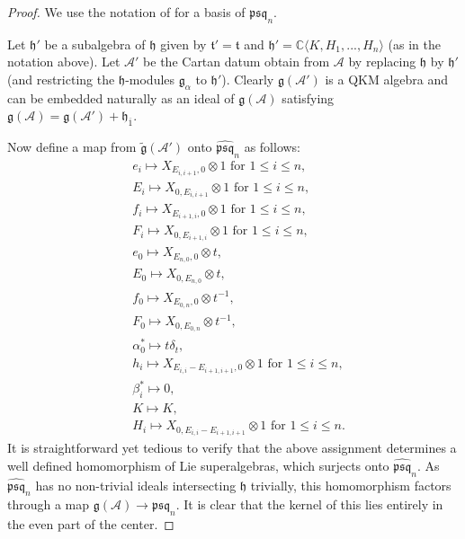 \documentclass[12pt, a4paper, reqno]{amsart}
\def\ol{\overline}
\theoremstyle{definition}
\theoremstyle{definition}
\theoremstyle{definition}
\numberwithin{theorem}{section}
\numberwithin{lemma}{section}
\numberwithin{remark}{section}
\numberwithin{definition}{section}
\numberwithin{corollary}{section}
\numberwithin{proposition}{section}
\numberwithin{example}{section}
\begin{document}
	\begin{proof}
		We use the notation of \cite{G} for a basis of \(\mathfrak{psq}_n\). \par	
		Let \(\mathfrak{h}'\) be a subalgebra of \(\mathfrak{h}\) given by \(\mathfrak{t}' = \mathfrak{t}\) and \(\mathfrak{h}' = \mathbb{C}\langle K,H_1,...,H_n \rangle\) (as in the notation above).
		Let \(\mathcal{A}'\) be the Cartan datum obtain from \(\mathcal{A}\) by replacing \(\mathfrak{h}\) by \(\mathfrak{h}'\) (and restricting the \(\mathfrak{h}\)-modules \(\mathfrak{g}_{\alpha}\) to \(\mathfrak{h}'\)). Clearly \(\mathfrak{g}(\mathcal{A}')\) is a QKM algebra and can be embedded naturally as an ideal of \(\mathfrak{g}(\mathcal{A})\) satisfying \(\mathfrak{g}(\mathcal{A}) = \mathfrak{g}(\mathcal{A}')+\mathfrak{h}_{\ol{1}}\). \par
		Now define a map from \(\tilde{\mathfrak{g}}(\mathcal{A}')\) onto \(\hat{\mathfrak{psq}}_n\) as follows:
		\begin{align*}
			&e_i \mapsto X_{E_{i,i+1}, 0}\otimes 1 \text{ for } 1\leq i \leq n, \\
			&E_i \mapsto X_{0, E_{i,i+1}}\otimes 1 \text{ for } 1\leq i \leq n, \\
			&f_i \mapsto X_{E_{i+1,i}, 0}\otimes 1 \text{ for } 1\leq i \leq n, \\
			&F_i \mapsto X_{0, E_{i+1,i}}\otimes 1 \text{ for } 1\leq i \leq n, \\
			&e_0 \mapsto X_{E_{n,0},0}\otimes t, \\
			&E_0 \mapsto X_{0,E_{n,0}}\otimes t, \\
			&f_0 \mapsto X_{E_{0,n},0}\otimes t^{-1}, \\ 
			&F_0 \mapsto X_{0,E_{0,n}}\otimes t^{-1}, \\
			&\alpha_0^* \mapsto t\delta_t, \\
			&h_i \mapsto X_{E_{i,i}-E_{i+1,i+1},0}\otimes 1 \text{ for } 1 \leq i \leq n, \\
			&\beta_i^* \mapsto 0, \\
			&K \mapsto K, \\
			&H_i \mapsto X_{0,E_{i,i}-E_{i+1,i+1}}\otimes 1 \text{ for } 1 \leq i \leq n.
		\end{align*}
		It is straightforward yet tedious to verify that the above assignment determines a well defined homomorphism of Lie superalgebras, which surjects onto \(\hat{\mathfrak{psq}}_n\). As \(\hat{\mathfrak{psq}}_n\) has no non-trivial ideals intersecting \(\mathfrak{h}\) trivially, this homomorphism factors through a map \(\mathfrak{g}(\mathcal{A})\rightarrow \hat{\mathfrak{psq}}_n\). It is clear that the kernel of this lies entirely in the even part of the center.
	\end{proof}
	
\end{document}
